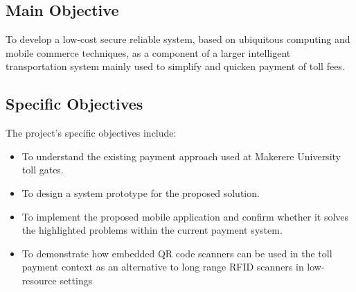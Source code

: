 \subsection{Main Objective}
To develop a low-cost secure reliable system, based on ubiquitous computing and mobile commerce techniques, as a component of a larger intelligent transportation system mainly used to simplify and quicken payment of toll fees.

\subsection{Specific Objectives}
The project's specific objectives include:
\begin{itemize}
    \item To understand the existing payment approach used at Makerere University toll gates.
    \item To design a system prototype for the proposed solution.
    \item To implement the proposed mobile application and confirm whether it solves the highlighted problems within the current payment system.
    \item To demonstrate how embedded QR code scanners can be used in the toll payment context as an alternative to long range RFID scanners in low-resource settings
\end{itemize}
